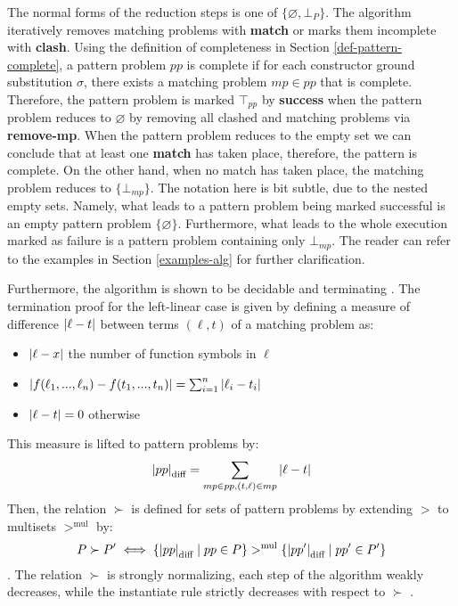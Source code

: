 The normal forms of the reduction steps is one of $\{\varnothing, \bot_{P}\}$. The algorithm iteratively removes matching problems with \textbf{match} or marks them incomplete with \textbf{clash}. Using the definition of completeness in Section \ref{def-pattern-complete}, a pattern problem $pp$ is complete if for each constructor ground substitution $\sigma$, there exists a matching problem $mp \in pp$ that is complete. Therefore, the pattern problem is marked $\top_{pp}$ by \textbf{success} when the pattern problem reduces to $\varnothing$ by removing all clashed and matching problems via \textbf{remove-mp}. When the pattern problem reduces to the empty set we can conclude that at least one \textbf{match} has taken place, therefore, the pattern is complete. On the other hand, when no match has taken place, the matching problem reduces to $\{\bot_{mp}\}$. The notation here is bit subtle, due to the nested empty sets. Namely, what leads to a pattern problem being marked successful is an empty pattern problem $\{\varnothing\}$. Furthermore, what leads to the whole execution marked as failure is a pattern problem containing only $\bot_{mp}$. The reader can refer to the examples in Section \ref{examples-alg} for further clarification.

Furthermore, the algorithm is shown to be decidable and terminating \cite{thiemann}. The termination proof for the left-linear case is given by defining a measure of difference $\abs{\ell - t}$ between terms \((\ell, t)\) of a matching problem as:
\begin{itemize}
    \item $\abs{\ell - x}$ the number of function symbols in $\ell$
    \item $\abs{f(\ell_1, ..., \ell_n) - f(t_1,...,t_n)} = \sum_{i=1}^{n} \abs{\ell_i - t_i}$
    \item $\abs{\ell - t} = 0$ otherwise
\end{itemize}
This measure is lifted to pattern problems by: 
$$\abs{pp}_{\text{diff}} = \sum_{mp \in pp, (t, \ell) \in mp} \abs{\ell - t}$$
Then, the relation $\succ$ is defined for sets of pattern problems by extending $>$ to multisets $>^{\text{mul}}$ by: 
$$P \succ P' \iff \{\abs{pp}_\text{diff} \mid pp \in P\} >^{\text{mul}} \{\abs{pp'}_\text{diff} \mid pp' \in P'\}$$.
The relation $\succ$ is strongly normalizing, each step of the algorithm weakly decreases, while the instantiate rule strictly decreases with respect to $\succ$ \cite{thiemann}. 

